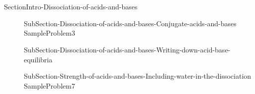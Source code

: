 \documentclass[main.tex]{subfiles}
\newcommand\chapterlabel{Ch-acidbase}\setcounter{figurenewcounter}{0}\setcounter{tablenewcounter}{0}\setcounter{formulanewcounter}{0}
\begin{document}
\section{\color{blue!30!black}{Dissociation of acids and bases}}{SectionIntro-Dissociation-of-acids-and-bases}
\sloppy\begin{description}
\item[] {SubSection-Dissociation-of-acids-and-bases-Conjugate-acids-and-bases}
{SampleProblem3}
\item[] {SubSection-Dissociation-of-acids-and-bases-Writing-down-acid-base-equilibria}

\item[] {SubSection-Strength-of-acids-and-bases-Including-water-in-the-dissociation}
{SampleProblem7}
\end{description}
\end{document}
